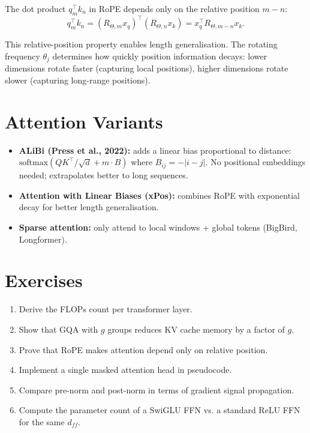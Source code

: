 \documentclass[11pt,a4paper]{book}
\theoremstyle{definition}
\begin{document}
The dot product $q_m^\top k_n$ in RoPE depends only on the relative position $m-n$:
\begin{equation}
	q_m^\top k_n = (R_{\Theta,m} x_q)^\top (R_{\Theta,n} x_k) = x_q^\top R_{\Theta, m-n} x_k.
\end{equation}

This relative-position property enables length generalisation. The rotating frequency $\theta_j$ determines how quickly position information decays: lower dimensions rotate faster (capturing local positions), higher dimensions rotate slower (capturing long-range positions).

\section{Attention Variants}

\begin{itemize}
	\item \textbf{ALiBi (Press et al., 2022):} adds a linear bias proportional to distance: $\text{softmax}(QK^\top / \sqrt{d} + m \cdot B)$ where $B_{ij} = -|i-j|$. No positional embeddings needed; extrapolates better to long sequences.
	\item \textbf{Attention with Linear Biases (xPos):} combines RoPE with exponential decay for better length generalisation.
	\item \textbf{Sparse attention:} only attend to local windows + global tokens (BigBird, Longformer).
\end{itemize}

\section{Exercises}

\begin{enumerate}
	\item Derive the FLOPs count per transformer layer.
	\item Show that GQA with $g$ groups reduces KV cache memory by a factor of $g$.
	\item Prove that RoPE makes attention depend only on relative position.
	\item Implement a single masked attention head in pseudocode.
	\item Compare pre-norm and post-norm in terms of gradient signal propagation.
	\item Compute the parameter count of a SwiGLU FFN vs. a standard ReLU FFN for the same $d_{ff}$.
\end{enumerate}
\end{document}
